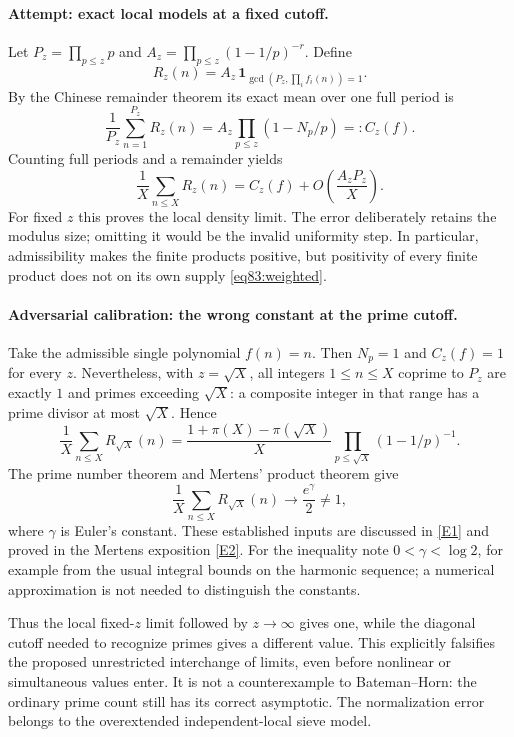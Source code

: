 \documentclass[11pt,a4paper]{article}
\numberwithin{equation}{section}
\newcommand{\eref}[2]{\hyperlink{extra:#1:#2}{[E#2]}}
\begin{document}
\paragraph{Attempt: exact local models at a fixed cutoff.}
Let $P_z=\prod_{p\leq z}p$ and
$A_z=\prod_{p\leq z}(1-1/p)^{-r}$. Define
\[
 R_z(n)=A_z\,\mathbf1_{\gcd(P_z,\prod_i f_i(n))=1}.
\]
By the Chinese remainder theorem its exact mean over one full period is
\begin{equation}\label{eq83:local}
 \frac1{P_z}\sum_{n=1}^{P_z}R_z(n)
 =A_z\prod_{p\leq z}(1-N_p/p)=:C_z(f).
\end{equation}
Counting full periods and a remainder yields
\begin{equation}\label{eq83:error}
 \frac1X\sum_{n\leq X}R_z(n)
       =C_z(f)+O\left(\frac{A_z P_z}{X}\right).
\end{equation}
For fixed $z$ this proves the local density limit. The error deliberately
retains the modulus size; omitting it would be the invalid uniformity
step. In particular, admissibility makes the finite products positive,
but positivity of every finite product does not on its own supply
\eqref{eq83:weighted}.

\paragraph{Adversarial calibration: the wrong constant at the prime cutoff.}
Take the admissible single polynomial $f(n)=n$. Then $N_p=1$ and
$C_z(f)=1$ for every $z$. Nevertheless, with $z=\sqrt X$, all integers
$1\leq n\leq X$ coprime to $P_z$ are exactly $1$ and primes exceeding
$\sqrt X$: a composite integer in that range has a prime divisor at most
$\sqrt X$. Hence
\[
 \frac1X\sum_{n\leq X}R_{\sqrt X}(n)
 =\frac{1+\pi(X)-\pi(\sqrt X)}X
           \prod_{p\leq\sqrt X}(1-1/p)^{-1}.
\]
The prime number theorem and Mertens' product theorem give
\begin{equation}\label{eq83:mismatch}
 \frac1X\sum_{n\leq X}R_{\sqrt X}(n)
       \longrightarrow\frac{e^\gamma}{2}\ne1,
\end{equation}
where $\gamma$ is Euler's constant. These established inputs are discussed
in \eref{30006717}{1} and proved in the Mertens exposition \eref{30006717}{2}.
For the inequality note $0<\gamma<\log2$, for example from the usual
integral bounds on the harmonic sequence; a numerical approximation is
not needed to distinguish the constants.

Thus the local fixed-$z$ limit followed by $z\to\infty$ gives one, while
the diagonal cutoff needed to recognize primes gives a different value.
This explicitly falsifies the proposed unrestricted interchange of limits,
even before nonlinear or simultaneous values enter. It is not a
counterexample to Bateman--Horn: the ordinary prime count still has its
correct asymptotic. The normalization error belongs to the overextended
independent-local sieve model.
\end{document}
